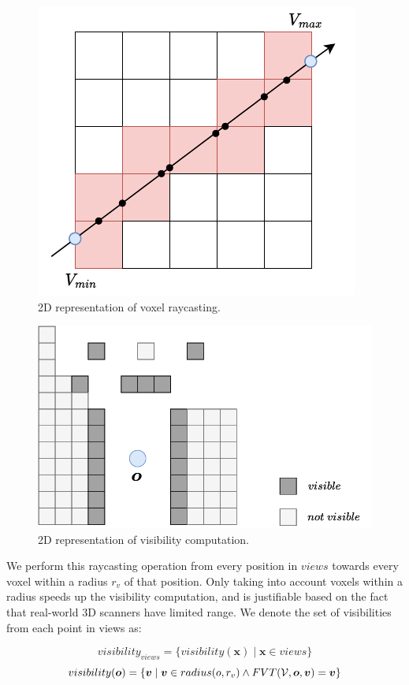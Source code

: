 \begin{figure}[h]
    \centering
    \includegraphics*[width=.5\textwidth]{./fig/dda.pdf}
    \caption{2D representation of voxel raycasting.}
    \label{fig:voxel_raycast}

\end{figure}

\begin{figure}[h]
    \centering
    \includegraphics*[width=.7\textwidth]{./fig/visibility.pdf}
    \caption{2D representation of visibility computation.}
    \label{fig:visibility}

\end{figure}

We perform this raycasting operation from every position in \(views\) towards every voxel within a radius \(r_{v}\) of that position. Only taking into account voxels within a radius speeds up the visibility computation, and is justifiable based on the fact that real-world 3D scanners have limited range. We denote the set of visibilities from each point in views as:

\begin{equation}
    \label{eq:visibility_views}
visibility_{views} = \{visibility(\boldsymbol{x}) \mid \boldsymbol{x} \in views\}
\end{equation}
\begin{equation}
    visibility(\boldsymbol{o}) = \{\boldsymbol{v} \mid \boldsymbol{v} \in radius(o, r_{v}) \land FVT(\mathcal{V},\boldsymbol{o},\boldsymbol{v}) = \boldsymbol{v}\}
\end{equation}


